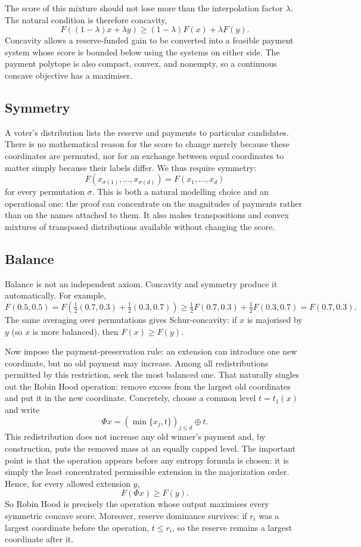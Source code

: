 \documentclass[11pt,a4paper]{article}
\theoremstyle{definition}
\theoremstyle{remark}
\begin{document}
The score of this mixture should not lose more than the interpolation factor $\lambda$. The natural condition is therefore concavity,
\[
F((1-\lambda)x+\lambda y)\ge(1-\lambda)F(x)+\lambda F(y).
\]
Concavity allows a reserve-funded gain to be converted into a feasible payment system whose score is bounded below using the systems on either side. The payment polytope is also compact, convex, and nonempty, so a continuous concave objective has a maximiser.

\subsection{Symmetry}
A voter's distribution lists the reserve and payments to particular candidates. There is no mathematical reason for the score to change merely because these coordinates are permuted, nor for an exchange between equal coordinates to matter simply because their labels differ. We thus require symmetry:
\[
F(x_{\sigma(1)},\ldots,x_{\sigma(d)})=F(x_1,\ldots,x_d)
\]
for every permutation $\sigma$.
This is both a natural modelling choice and an operational one: the proof can concentrate on the magnitudes of payments rather than on the names attached to them. It also makes transpositions and convex mixtures of transposed distributions available without changing the score.

\subsection{Balance}
Balance is not an independent axiom. Concavity and symmetry produce it automatically. For example,
\[
F(0.5,0.5)=F\!\left(\tfrac12(0.7,0.3)+\tfrac12(0.3,0.7)\right)
\ge\tfrac12F(0.7,0.3)+\tfrac12F(0.3,0.7)=F(0.7,0.3).
\]
The same averaging over permutations gives Schur-concavity: if $x$ is majorised by $y$ (so $x$ is more balanced), then $F(x)\ge F(y)$.

Now impose the payment-preservation rule: an extension can introduce one new coordinate, but no old payment may increase. Among all redistributions permitted by this restriction, seek the most balanced one. That naturally singles out the Robin Hood operation: remove excess from the largest old coordinates and put it in the new coordinate. Concretely, choose a common level $t=t_1(x)$ and write
\[
\Phi x=(\min\{x_j,t\})_{j\le d}\oplus t.
\]
This redistribution does not increase any old winner's payment and, by construction, puts the removed mass at an equally capped level. The important point is that the operation appears before any entropy formula is chosen: it is simply the least concentrated permissible extension in the majorization order. Hence, for every allowed extension $y$,
\[
F(\Phi x)\ge F(y).
\]
So Robin Hood is precisely the operation whose output maximises every symmetric concave score. Moreover, reserve dominance survives: if $r_i$ was a largest coordinate before the operation, $t\le r_i$, so the reserve remains a largest coordinate after it.
\end{document}
